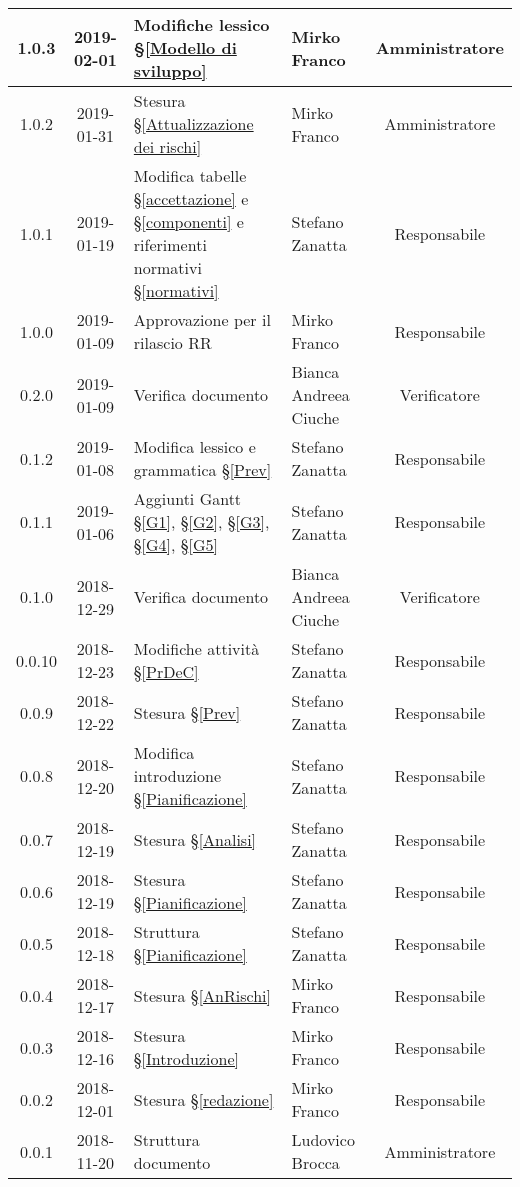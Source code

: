 \begin{center}
\begin{tabularx}{\textwidth}{|c|c|X|X|c|}
			\hline
			1.0.3 & 2019-02-01 & Modifiche lessico \S\ref{Modello di sviluppo} & Mirko Franco & Amministratore \\
			\hline
			1.0.2 & 2019-01-31 & Stesura \S\ref{Attualizzazione dei rischi} & Mirko Franco & Amministratore \\
			\hline
			1.0.1 & 2019-01-19 & Modifica tabelle \S\ref{accettazione} e \S\ref{componenti} e riferimenti normativi \S\ref{normativi} & Stefano Zanatta & Responsabile\\
			\hline
			1.0.0 & 2019-01-09 & Approvazione per il rilascio RR & Mirko Franco & Responsabile\\
			\hline
			0.2.0 & 2019-01-09 & Verifica documento & Bianca Andreea Ciuche& Verificatore\\
			\hline
			0.1.2 & 2019-01-08 & Modifica lessico e grammatica \S\ref{Prev}& Stefano Zanatta & Responsabile\\
			\hline
			0.1.1 & 2019-01-06 & Aggiunti Gantt \S\ref{G1}, \S\ref{G2}, \S\ref{G3}, \S\ref{G4}, \S\ref{G5} & Stefano Zanatta & Responsabile\\
			\hline
			0.1.0 & 2018-12-29 & Verifica documento & Bianca Andreea Ciuche& Verificatore\\
			\hline
			0.0.10 & 2018-12-23 & Modifiche attività \S\ref{PrDeC} & Stefano Zanatta & Responsabile\\
			\hline
			0.0.9 & 2018-12-22 & Stesura \S\ref{Prev} & Stefano Zanatta & Responsabile\\
			\hline
			0.0.8 & 2018-12-20 & Modifica introduzione \S\ref{Pianificazione} & Stefano Zanatta & Responsabile\\
			\hline
			0.0.7 & 2018-12-19 & Stesura \S\ref{Analisi}& Stefano Zanatta & Responsabile\\
			\hline
			0.0.6 & 2018-12-19 & Stesura \S\ref{Pianificazione} & Stefano Zanatta & Responsabile\\
			\hline
			0.0.5 & 2018-12-18 & Struttura \S\ref{Pianificazione} & Stefano Zanatta & Responsabile\\
			\hline
			0.0.4 & 2018-12-17 & Stesura \S\ref{AnRischi} & Mirko Franco & Responsabile\\
			\hline
			0.0.3 & 2018-12-16 & Stesura \S\ref{Introduzione} & Mirko Franco& Responsabile\\
			\hline
			0.0.2 & 2018-12-01 & Stesura \S\ref{redazione} & Mirko Franco& Responsabile\\
			\hline
			0.0.1 & 2018-11-20 & Struttura documento & Ludovico Brocca & Amministratore\\
			\hline

		\end{tabularx}
	\end{center}
\newpage
